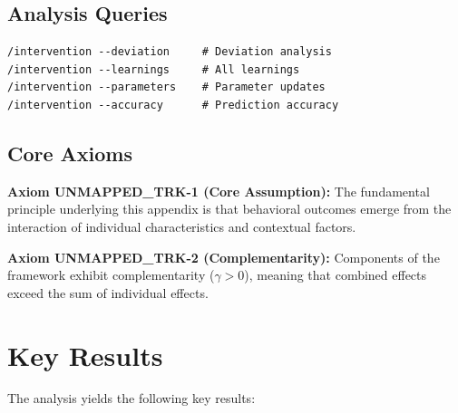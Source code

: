 \subsection{Analysis Queries}

\begin{verbatim}
/intervention --deviation     # Deviation analysis
/intervention --learnings     # All learnings
/intervention --parameters    # Parameter updates
/intervention --accuracy      # Prediction accuracy
\end{verbatim}


\subsection{Core Axioms}
\label{sec:trk-axioms}

\begin{tcolorbox}[colback=yellow!5!white,colframe=yellow!75!black,title=Axiom UNMAPPED_TRK-1: Fundamental Principle]
\textbf{Axiom UNMAPPED_TRK-1 (Core Assumption):}
The fundamental principle underlying this appendix is that behavioral outcomes
emerge from the interaction of individual characteristics and contextual factors.
\end{tcolorbox}

\begin{tcolorbox}[colback=yellow!5!white,colframe=yellow!75!black,title=Axiom UNMAPPED_TRK-2: Complementarity]
\textbf{Axiom UNMAPPED_TRK-2 (Complementarity):}
Components of the framework exhibit complementarity ($\gamma > 0$), meaning
that combined effects exceed the sum of individual effects.
\end{tcolorbox}



\section{Key Results}
\label{sec:trk-results}

The analysis yields the following key results:

